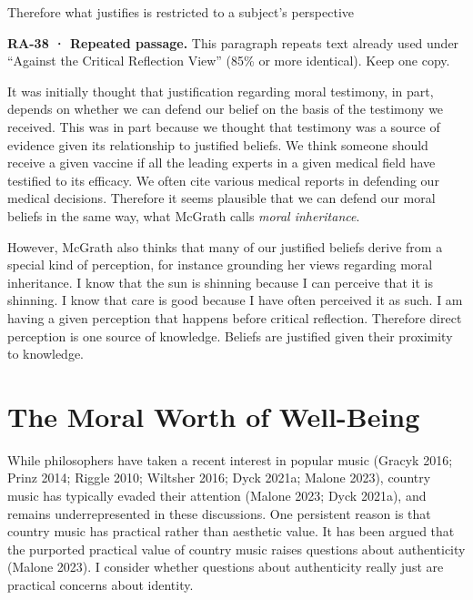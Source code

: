 \documentclass[
  letterpaper,
  DIV=11,
  numbers=noendperiod]{scrartcl}
\theoremstyle{remark}
\begin{document}
Therefore what justifies is restricted to a subject's perspective

\begin{tcolorbox}[enhanced jigsaw, arc=.35mm, bottomrule=.15mm, bottomtitle=1mm, breakable, colback=white, colbacktitle=quarto-callout-important-color!10!white, colframe=quarto-callout-important-color-frame, coltitle=black, left=2mm, leftrule=.75mm, opacityback=0, opacitybacktitle=0.6, rightrule=.15mm, title=\textcolor{quarto-callout-important-color}{\faExclamation}\hspace{0.5em}{Important}, titlerule=0mm, toprule=.15mm, toptitle=1mm]

\textbf{RA-38 · Repeated passage.} This paragraph repeats text already
used under ``Against the Critical Reflection View'' (85\% or more
identical). Keep one copy.

\end{tcolorbox}

It was initially thought that justification regarding moral testimony,
in part, depends on whether we can defend our belief on the basis of the
testimony we received. This was in part because we thought that
testimony was a source of evidence given its relationship to justified
beliefs. We think someone should receive a given vaccine if all the
leading experts in a given medical field have testified to its efficacy.
We often cite various medical reports in defending our medical
decisions. Therefore it seems plausible that we can defend our moral
beliefs in the same way, what McGrath calls \emph{moral inheritance}.

However, McGrath also thinks that many of our justified beliefs derive
from a special kind of perception, for instance grounding her views
regarding moral inheritance. I know that the sun is shinning because I
can perceive that it is shinning. I know that care is good because I
have often perceived it as such. I am having a given perception that
happens before critical reflection. Therefore direct perception is one
source of knowledge. Beliefs are justified given their proximity to
knowledge.

\section{The Moral Worth of
Well-Being}\label{the-moral-worth-of-well-being}

While philosophers have taken a recent interest in popular music (Gracyk
2016; Prinz 2014; Riggle 2010; Wiltsher 2016; Dyck 2021a; Malone 2023),
country music has typically evaded their attention (Malone 2023; Dyck
2021a), and remains underrepresented in these discussions. One
persistent reason is that country music has practical rather than
aesthetic value. It has been argued that the purported practical value
of country music raises questions about authenticity (Malone 2023). I
consider whether questions about authenticity really just are practical
concerns about identity.
\end{document}
